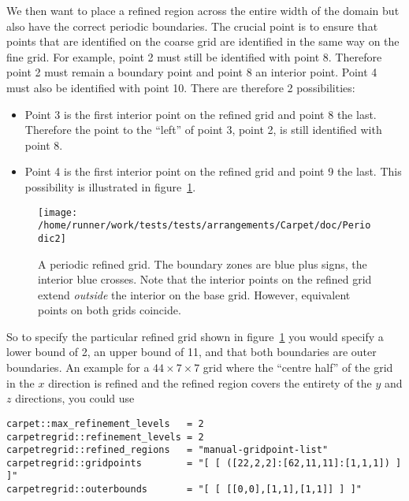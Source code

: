 \begin{enumerate}
  We then want to place a refined region across the entire width of
  the domain but also have the correct periodic boundaries. The
  crucial point is to ensure that points that are identified on the
  coarse grid are identified in the same way on the fine grid. For
  example, point 2 must still be identified with point 8. Therefore
  point 2 must remain a boundary point and point 8 an interior
  point. Point 4 must also be identified with point 10. There are
  therefore 2 possibilities:
  \begin{itemize}
  \item Point 3 is the first interior point on the refined grid and
    point 8 the last. Therefore the point to the ``left'' of point 3,
    point 2, is still identified with point 8.
  \item Point 4 is the first interior point on the refined grid and
    point 9 the last. This possibility is illustrated in
    figure~\ref{fig:Periodic2}.
  \end{itemize}
  \begin{figure}[htbp]
    \begin{center}
      \texttt{[image: /home/runner/work/tests/tests/arrangements/Carpet/doc/Periodic2]}
      \caption{A periodic refined grid. The boundary zones are blue
        plus signs, the interior blue crosses. Note that the interior
        points on the refined grid extend \textit{outside} the
        interior on the base grid. However, equivalent points on both
        grids coincide.}
      \label{fig:Periodic2}
    \end{center}
  \end{figure}
  
  So to specify the particular refined grid shown in
  figure~\ref{fig:Periodic2} you would specify a lower bound of 2, an
  upper bound of 11, and that both boundaries are outer boundaries. An
  example for a $44 \times 7 \times 7$ grid where the ``centre half''
  of the grid in the $x$ direction is refined and the refined region
  covers the entirety of the $y$ and $z$ directions, you could use
\begin{verbatim}
carpet::max_refinement_levels   = 2
carpetregrid::refinement_levels = 2
carpetregrid::refined_regions   = "manual-gridpoint-list"
carpetregrid::gridpoints        = "[ [ ([22,2,2]:[62,11,11]:[1,1,1]) ] ]"
carpetregrid::outerbounds       = "[ [ [[0,0],[1,1],[1,1]] ] ]"
\end{verbatim}

\end{enumerate}

